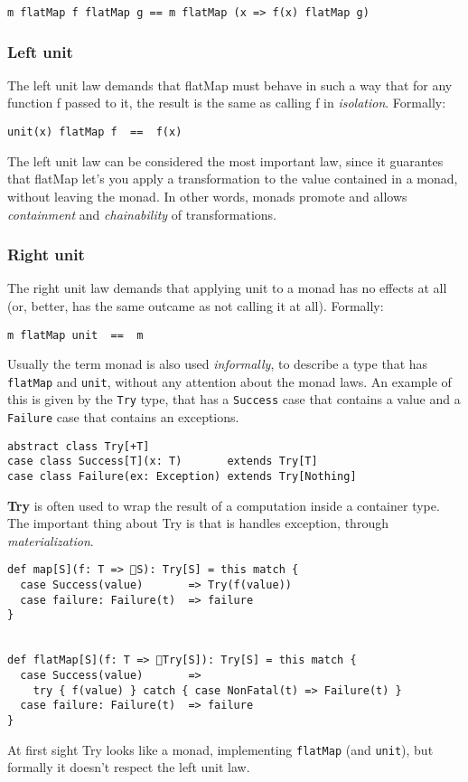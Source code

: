 \begin{verbatim}
m flatMap f flatMap g == m flatMap (x => f(x) flatMap g)
\end{verbatim}

\subsubsection{Left unit}\label{left-unit}

The left unit law demands that flatMap must behave in such a way that
for any function f passed to it, the result is the same as calling f in
\emph{isolation}. Formally:

\begin{verbatim}
unit(x) flatMap f  ==  f(x)
\end{verbatim}

The left unit law can be considered the most important law, since it
guarantes that flatMap let's you apply a transformation to the value
contained in a monad, without leaving the monad. In other words, monads
promote and allows \emph{containment} and \emph{chainability} of
transformations.

\subsubsection{Right unit}\label{right-unit}

The right unit law demands that applying unit to a monad has no effects
at all (or, better, has the same outcame as not calling it at all).
Formally:

\begin{verbatim}
m flatMap unit  ==  m
\end{verbatim}

Usually the term monad is also used \emph{informally}, to describe a
type that has \texttt{flatMap} and \texttt{unit}, without any attention
about the monad laws. An example of this is given by the \texttt{Try}
type, that has a \texttt{Success} case that contains a value and a
\texttt{Failure} case that contains an exceptions.

\begin{verbatim}
abstract class Try[+T]
case class Success[T](x: T)       extends Try[T]
case class Failure(ex: Exception) extends Try[Nothing]
\end{verbatim}

\textbf{Try} is often used to wrap the result of a computation inside a
container type. The important thing about Try is that is handles
exception, through \emph{materialization}.

\begin{verbatim}
def map[S](f: T => 􏰀S): Try[S] = this match {
  case Success(value)       => Try(f(value))
  case failure: Failure(t)  => failure
}


def flatMap[S](f: T => 􏰀Try[S]): Try[S] = this match {
  case Success(value)       =>
    try { f(value) } catch { case NonFatal(t) => Failure(t) }
  case failure: Failure(t)  => failure
}
\end{verbatim}

At first sight Try looks like a monad, implementing \texttt{flatMap}
(and \texttt{unit}), but formally it doesn't respect the left unit law.

